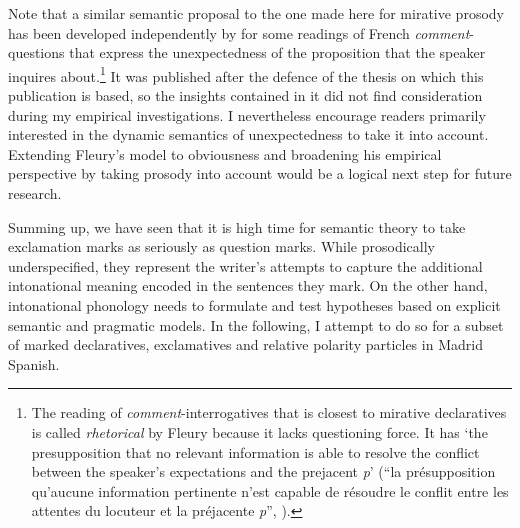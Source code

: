 Note that a similar semantic proposal to the one made here for mirative pro\-so\-dy has been developed independently by \citet[195–230]{Fleury.2021} for some readings of French \textit{comment}-questions that express the unexpectedness of the proposition that the speaker inquires about.\footnote{The reading of \textit{comment}-interrogatives that is closest to mirative declaratives is called \textit{rhetorical} by Fleury because it lacks questioning force. It has `the presupposition that no relevant information is able to resolve the conflict between the speaker's expectations and the prejacent \textit{p}' (``la présupposition qu’aucune information pertinente n’est capable de résoudre le conflit entre les attentes du locuteur et la préjacente \textit{p}'', \citealt[52]{Fleury.2021}).} It was published after the defence of the thesis on which this publication is based, so the insights contained in it did not find consideration during my empirical investigations. I nevertheless encourage readers primarily interested in the dynamic semantics of unexpectedness to take it into account. Extending Fleury's model to obviousness and broadening his empirical perspective by taking prosody into account would be a logical next step for future research.

Summing up, we have seen that it is high time for semantic theory to take exclamation marks as seriously as question marks. While prosodically underspecified, they represent the writer's attempts to capture the additional intonational meaning encoded in the sentences they mark. On the other hand, intonational phonology needs to formulate and test hypotheses based on explicit semantic and pragmatic models. In the following, I attempt to do so for a subset of marked declaratives, exclamatives and relative polarity particles in Madrid Spanish.

